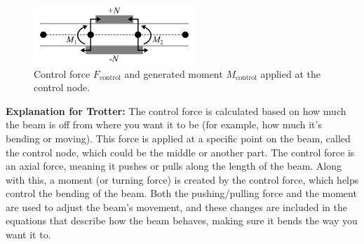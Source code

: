 \documentclass{article}
\begin{document}
	\begin{figure}[h!]
		\centering
		\includegraphics[width=2.4in]{Figures/ControlForces_Figure.png}
		\caption{Control force \( F_{\text{control}} \) and generated moment \( M_{\text{control}} \) applied at the control node.}
		\label{fig:control_forces}
	\end{figure}
	
	\textbf{Explanation for Trotter:} The control force is calculated based on how much the beam is off from where you want it to be (for example, how much it's bending or moving). This force is applied at a specific point on the beam, called the control node, which could be the middle or another part. The control force is an axial force, meaning it pushes or pulls along the length of the beam. Along with this, a moment (or turning force) is created by the control force, which helps control the bending of the beam. Both the pushing/pulling force and the moment are used to adjust the beam’s movement, and these changes are included in the equations that describe how the beam behaves, making sure it bends the way you want it to.
\end{document}
